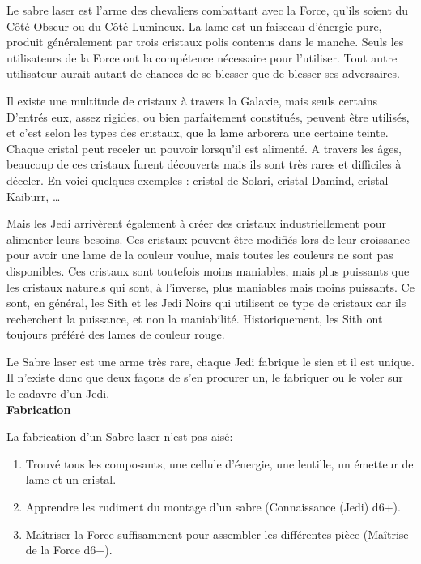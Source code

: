 Le sabre laser est l’arme des chevaliers combattant avec la Force, qu’ils soient du Côté Obscur ou du Côté Lumineux. La lame est un faisceau d’énergie pure, produit généralement par trois cristaux polis contenus dans le manche. Seuls les utilisateurs de la Force ont la compétence nécessaire pour l’utiliser. Tout autre utilisateur aurait autant de chances de se blesser que de blesser ses adversaires. 

Il existe une multitude de cristaux à travers la Galaxie, mais seuls certains D’entrés eux, assez rigides, ou bien parfaitement constitués, peuvent être utilisés, et c’est selon les types des cristaux, que la lame arborera une certaine teinte. Chaque cristal peut receler un pouvoir lorsqu’il est alimenté. A travers les âges, beaucoup de ces cristaux furent découverts mais ils sont très rares et difficiles à déceler. En voici quelques exemples : cristal de Solari, cristal Damind, cristal Kaiburr, \ldots

Mais les Jedi arrivèrent également à créer des cristaux industriellement pour alimenter leurs besoins. Ces cristaux peuvent être modifiés lors de leur croissance pour avoir une lame de la couleur voulue, mais toutes les couleurs ne sont pas disponibles. Ces cristaux sont toutefois moins maniables, mais plus puissants que les cristaux naturels qui sont, à l’inverse, plus maniables mais moins puissants. Ce sont, en général, les Sith et les Jedi Noirs qui utilisent ce type de cristaux car ils recherchent la puissance, et non la maniabilité. Historiquement, les Sith ont toujours préféré des lames de couleur rouge. 

Le Sabre laser est une arme très rare, chaque Jedi fabrique le sien et il est unique. Il n’existe donc que deux façons de s’en procurer un, le fabriquer ou le voler sur le cadavre d’un Jedi.\\

\noindent\textbf{Fabrication}

La fabrication d’un Sabre laser n’est pas aisé:
\begin{enumerate}
	\item Trouvé tous les composants, une cellule d’énergie, une lentille, un émetteur de lame et un cristal.
	\item Apprendre les rudiment du montage d’un sabre (Connaissance (Jedi) d6+).
	\item Maîtriser la Force suffisamment pour assembler les différentes pièce (Maîtrise de la Force d6+).
\end{enumerate}

